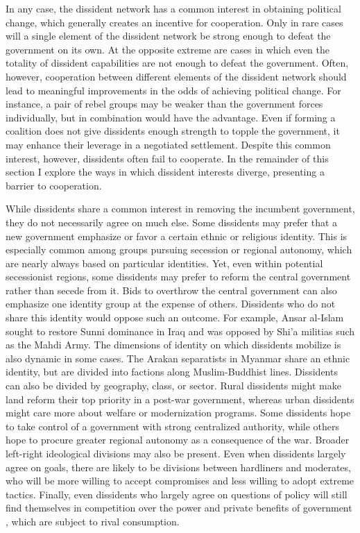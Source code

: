 In any case, the dissident network has a common interest in obtaining political change, which generally creates an incentive for cooperation. Only in rare cases will a single element of the dissident network be strong enough to defeat the government on its own. At the opposite extreme are cases in which even the totality of dissident capabilities are not enough to defeat the government. Often, however, cooperation between different elements of the dissident network should lead to meaningful improvements in the odds of achieving political change. For instance, a pair of rebel groups may be weaker than the government forces individually, but in combination would have the advantage. Even if forming a coalition does not give dissidents enough strength to topple the government, it may enhance their leverage in a negotiated settlement. Despite this common interest, however, dissidents often fail to cooperate. In the remainder of this section I explore the ways in which dissident interests diverge, presenting a barrier to cooperation.

While dissidents share a common interest in removing the incumbent government, they do not necessarily agree on much else. Some dissidents may prefer that a new government emphasize or favor a certain ethnic or religious identity. This is especially common among groups pursuing secession or regional autonomy, which are nearly always based on particular identities. Yet, even within potential secessionist regions, some dissidents may prefer to reform the central government rather than secede from it. Bids to overthrow the central government can also emphasize one identity group at the expense of others. Dissidents who do not share this identity would oppose such an outcome. For example, Ansar al-Islam sought to restore Sunni dominance in Iraq and was opposed by Shi'a militias such as the Mahdi Army. The dimensions of identity on which dissidents mobilize is also dynamic in some cases. The Arakan separatists in Myanmar share an ethnic identity, but are divided into factions along Muslim-Buddhist lines. Dissidents can also be divided by geography, class, or sector. Rural dissidents might make land reform their top priority in a post-war government, whereas urban dissidents might care more about welfare or modernization programs. Some dissidents hope to take control of a government with strong centralized authority, while others hope to procure greater regional autonomy as a consequence of the war. Broader left-right ideological divisions may also be present. Even when dissidents largely agree on goals, there are likely to be divisions between hardliners and moderates, who will be more willing to accept compromises and less willing to adopt extreme tactics. Finally, even dissidents who largely agree on questions of policy will still find themselves in competition over the power and private benefits of government \citep{Christia2012}, which are subject to rival consumption.


